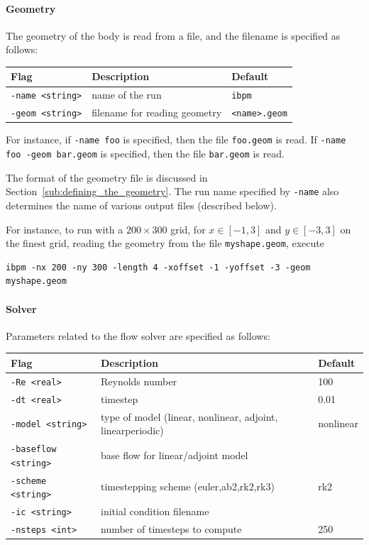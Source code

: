 \documentclass[11pt]{article}
\begin{document}
\paragraph{Geometry}
The geometry of the body is read from a file, and the filename is specified as follows:
\begin{center}
\begin{tabular}{lll}
Flag & Description & Default\\
\hline
\verb|-name <string>|    & name of the run & {\tt ibpm}\\
\verb|-geom <string>|    & filename for reading geometry & \verb|<name>.geom|
\end{tabular}
\end{center}
For instance, if {\tt -name foo} is specified, then the file {\tt foo.geom} is read.  If {\tt -name foo -geom bar.geom} is specified, then the file {\tt bar.geom} is read.

The format of the geometry file is discussed in Section~\ref{sub:defining_the_geometry}. The run name specified by {\tt -name} also determines the name of various output files (described below).

For instance, to run with a $200\times 300$ grid, for $x\in[-1,3]$ and $y\in [-3,3]$ on the finest grid, reading the geometry from the file {\tt myshape.geom}, execute
\begin{Verbatim}
ibpm -nx 200 -ny 300 -length 4 -xoffset -1 -yoffset -3 -geom myshape.geom
\end{Verbatim}


\paragraph{Solver}
Parameters related to the flow solver are specified as follows:

\begin{center}
\begin{tabular}{lp{2.5in}l}
Flag & Description & Default\\
\hline
\verb|-Re <real>|        & Reynolds number & 100\\
\verb|-dt <real>|        & timestep & 0.01\\
\verb|-model <string>|   & type of model (linear, nonlinear, adjoint, linearperiodic) & nonlinear\\
\verb|-baseflow <string>| & base flow for linear/adjoint model\\
\verb|-scheme <string>|   & timestepping scheme (euler,ab2,rk2,rk3) & rk2\\
\verb|-ic <string>|       & initial condition filename \\
\verb|-nsteps <int>|    & number of timesteps to compute & 250\\
\end{tabular}
\end{center}
\end{document}
